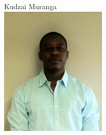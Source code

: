 \documentclass[a4paper,12pt]{article}
\begin{document}
\begin{center}
{\Large Kudzai {Muranga}} \\[0.3cm]
\includegraphics[width= 2in]{Kudzai.jpg}\\[0.4cm] 
\end{center}
\end{document}
